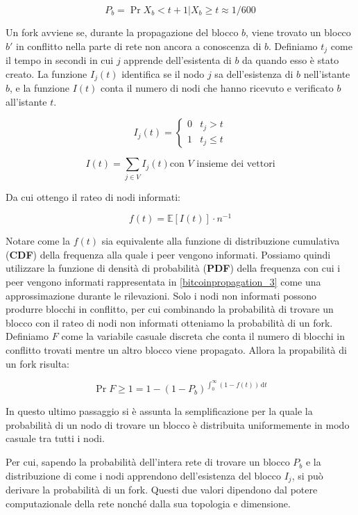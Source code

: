 \[ P_b = \Pr{X_b < t + 1 | X_b \geq t} \approx 1/600 \]

Un fork avviene se, durante la propagazione del blocco $b$, viene
trovato un blocco $b'$ in conflitto nella parte di rete non ancora a
conoscenza di $b$. Definiamo $t_j$ come il tempo in secondi in cui $j$
apprende dell'esistenta di $b$ da quando esso è stato creato. La
funzione $I_{j}(t)$ identifica se il nodo $j$ sa dell'esistenza di $b$
nell'istante $b$, e la funzione $I(t)$ conta il numero di nodi che hanno
ricevuto e verificato $b$ all'istante $t$.

\[ I_{j}(t) = \left \lbrace 
\begin{array}{ll}
    0 & t_j > t \\
    1 & t_j \leq t
\end{array}\]

\[ I(t) = \sum_{j \in V} I_{j}(t) \textrm{con }V\textrm{ insieme dei vettori} \]

Da cui ottengo il rateo di nodi informati:

\[ f(t) = \mathbb{E}[I(t)] \cdot n^{-1} \]

Notare come la $f(t)$ sia equivalente alla funzione di distribuzione
cumulativa (\textbf{CDF}) della frequenza alla quale i peer vengono
informati. Possiamo quindi utilizzare la funzione di densità di
probabilità (\textbf{PDF}) della frequenza con cui i peer vengono
informati rappresentata in \ref{bitcoinpropagation_3} come una
approssimazione durante le rilevazioni. Solo i nodi non informati
possono produrre blocchi in conflitto, per cui combinando la probabilità
di trovare un blocco con il rateo di nodi non informati otteniamo la
probabilità di un fork. Definiamo $F$ come la variabile casuale discreta
che conta il numero di blocchi in conflitto trovati mentre un altro
blocco viene propagato. Allora la propabilità di un fork risulta:

\[ \Pr{F \geq 1} = 1 - (1 - P_b)^{\int_{0}^{\infty} \! (1 - f(t)) \, \mathrm{d}t} \]

In questo ultimo passaggio si è assunta la semplificazione per la quale
la probabilità di un nodo di trovare un blocco è distribuita
uniformemente in modo casuale tra tutti i nodi.

Per cui, sapendo la probabilità dell'intera rete di trovare un blocco
$P_b$ e la distribuzione di come i nodi apprendono dell'esistenza del
blocco $I_j$, si può derivare la probabilità di un fork. Questi due
valori dipendono dal potere computazionale della rete nonché dalla sua
topologia e dimensione.

